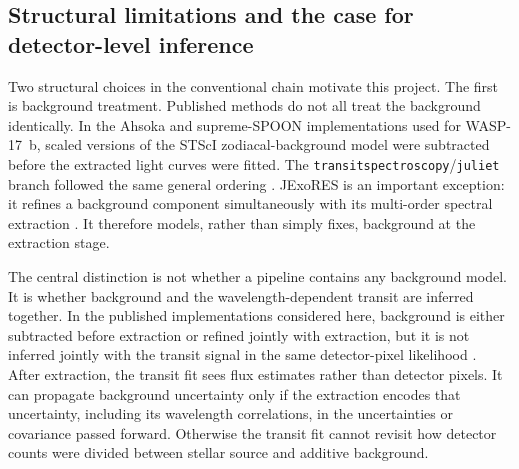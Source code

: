\subsection{Structural limitations and the case for detector-level inference}
\label{sec:structural-limitations-inference}
\label{sec:structural-limitations}
\label{sec:benchmark-and-nova}


Two structural choices in the conventional chain motivate this project. The
first is background treatment. Published methods do not all treat the
background identically. In the Ahsoka and supreme-SPOON implementations used
for WASP-17~b, scaled versions of the STScI zodiacal-background model were
subtracted before the extracted light curves were fitted. The
\texttt{transitspectroscopy}/\texttt{juliet} branch followed the same general
ordering \citep{LouieEtAl2025}. JExoRES is an important exception: it refines a
background component simultaneously with its multi-order spectral extraction
\citep{HolmbergMadhusudhan2023}. It therefore models, rather than simply fixes,
background at the extraction stage.

The central distinction is not whether a pipeline contains any background
model. It is whether background and the wavelength-dependent transit are
inferred together. In the published implementations considered here,
background is either subtracted before extraction or refined jointly with
extraction, but it is not inferred jointly with the transit signal in the same
detector-pixel likelihood
\citep{HolmbergMadhusudhan2023,LouieEtAl2025}. After extraction, the transit
fit sees flux estimates rather than detector pixels. It can propagate
background uncertainty only if the extraction encodes that uncertainty,
including its wavelength correlations, in the uncertainties or covariance
passed forward. Otherwise the transit fit cannot revisit how detector counts
were divided between stellar source and additive background.

